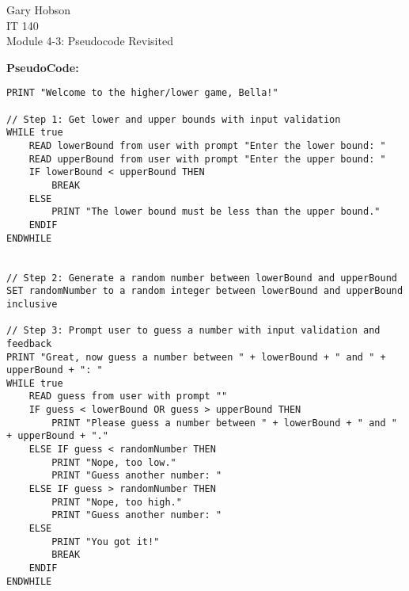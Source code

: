 \documentclass[12pt]{article}
\begin{document}
\begin{center}
    Gary Hobson \\
    IT 140 \\
    Module 4-3: Pseudocode Revisited
\end{center}

\textbf{PseudoCode:}

\begin{lstlisting}
PRINT "Welcome to the higher/lower game, Bella!"

// Step 1: Get lower and upper bounds with input validation
WHILE true
    READ lowerBound from user with prompt "Enter the lower bound: "
    READ upperBound from user with prompt "Enter the upper bound: "
    IF lowerBound < upperBound THEN
        BREAK
    ELSE
        PRINT "The lower bound must be less than the upper bound."
    ENDIF
ENDWHILE


// Step 2: Generate a random number between lowerBound and upperBound
SET randomNumber to a random integer between lowerBound and upperBound inclusive

// Step 3: Prompt user to guess a number with input validation and feedback
PRINT "Great, now guess a number between " + lowerBound + " and " + upperBound + ": "
WHILE true
    READ guess from user with prompt ""
    IF guess < lowerBound OR guess > upperBound THEN
        PRINT "Please guess a number between " + lowerBound + " and " + upperBound + "."
    ELSE IF guess < randomNumber THEN
        PRINT "Nope, too low."
        PRINT "Guess another number: "
    ELSE IF guess > randomNumber THEN
        PRINT "Nope, too high."
        PRINT "Guess another number: "
    ELSE
        PRINT "You got it!"
        BREAK
    ENDIF
ENDWHILE
\end{lstlisting}
\end{document}
